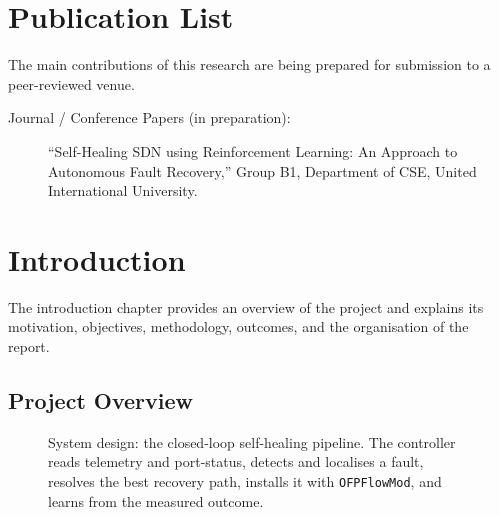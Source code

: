 \documentclass[12pt,a4paper]{report}
\begin{document}
\chapter*{Publication List}
The main contributions of this research are being prepared for submission to a
peer-reviewed venue.
\begin{description}
\item[Journal / Conference Papers (in preparation):] ``Self-Healing SDN using
Reinforcement Learning: An Approach to Autonomous Fault Recovery,'' Group B1, Department of
CSE, United International University.
\end{description}

\tableofcontents
\listoffigures
\listoftables

\chapter{Introduction}
The introduction chapter provides an overview of the project and explains its motivation,
objectives, methodology, outcomes, and the organisation of the report.

\section{Project Overview}
\begin{figure}[t]
\centering
{}
\caption{System design: the closed-loop self-healing pipeline. The controller reads
telemetry and port-status, detects and localises a fault, resolves the best recovery path,
installs it with \texttt{OFPFlowMod}, and learns from the measured outcome.}
\label{fig:system-design}
\end{figure}
\end{document}
